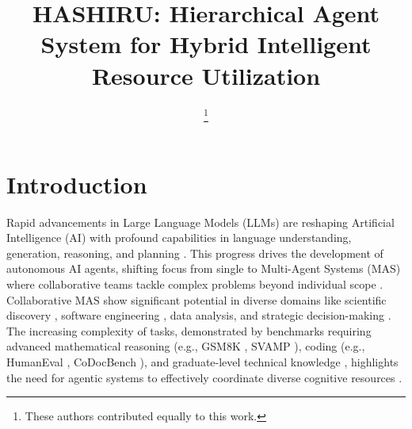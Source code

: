 \documentclass[conference]{IEEEtran}
\begin{document}
\title{HASHIRU: Hierarchical Agent System for Hybrid Intelligent Resource Utilization}

\author{
  \and
  \and
  \and
  \thanks{These authors contributed equally to this work.}
}
\maketitle

\section{Introduction}\label{sec:introduction}

Rapid advancements in Large Language Models (LLMs) are reshaping Artificial Intelligence (AI) with profound capabilities in language understanding, generation, reasoning, and planning \cite{brown2020language, devlin2019bert, raffel2020exploring}. This progress drives the development of autonomous AI agents, shifting focus from single to Multi-Agent Systems (MAS) where collaborative teams tackle complex problems beyond individual scope \cite{dorri2018multi, wooldridge2009introduction}. Collaborative MAS show significant potential in diverse domains like scientific discovery \cite{boiko2023emergent}, software engineering \cite{qian2023communicative}, data analysis, and strategic decision-making \cite{wang2023decision}. The increasing complexity of tasks, demonstrated by benchmarks requiring advanced mathematical reasoning (e.g., GSM8K \cite{cobbe2021gsm8k}, SVAMP \cite{patel2021svamp}), coding (e.g., HumanEval \cite{chen2021codex}, CoDocBench \cite{pai2024codocbench}), and graduate-level technical knowledge \cite{phan2025humanitysexam}, highlights the need for agentic systems to effectively coordinate diverse cognitive resources \cite{wen2024benchmarkingcomplexinstructionfollowingmultiple}.
\end{document}
